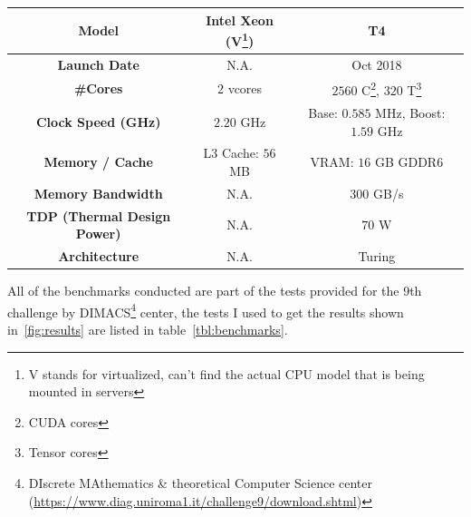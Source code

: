 \documentclass[a4paper,10pt]{article}
\begin{document}
\begin{center}
\begin{longtable}{|c|c|c|}
		\textbf{Model}                      & Intel Xeon (V\footnote{V stands for virtualized, can't find the actual CPU model that is being mounted in servers}) & T4                                                                  \\\hline
		\textbf{Launch Date}                & N.A.                                                                                                                & Oct 2018                                                            \\\hline
		\textbf{\#Cores}                    & $2$ vcores                                                                                                          & $\num{2560}$ C\footnote{CUDA cores}, $320$ T\footnote{Tensor cores} \\\hline
		\textbf{Clock Speed (GHz)}          & $\num{2.20}$ GHz                                                                                                    & Base: $0.585$ MHz, Boost: $1.59$ GHz                                \\\hline
		\textbf{Memory / Cache}             & L3 Cache: $56$ MB                                                                                                   & VRAM: $16$ GB GDDR6                                                 \\\hline
		\textbf{Memory Bandwidth}           & N.A.                                                                                                                & 300 GB/s                                                            \\\hline
		\textbf{TDP (Thermal Design Power)} & N.A.                                                                                                                & $70$ W                                                              \\\hline
		\textbf{Architecture}               & N.A.                                                                                                                & Turing
	\end{longtable}
\end{center}
All of the benchmarks conducted are part of the tests provided for the 9th challenge by DIMACS\footnote{DIscrete MAthematics \& theoretical Computer Science center (\url{https://www.diag.uniroma1.it/challenge9/download.shtml})} center, the tests I used to get the results shown in~\ref{fig:results} are listed in table~\ref{tbl:benchmarks}.
\end{document}

